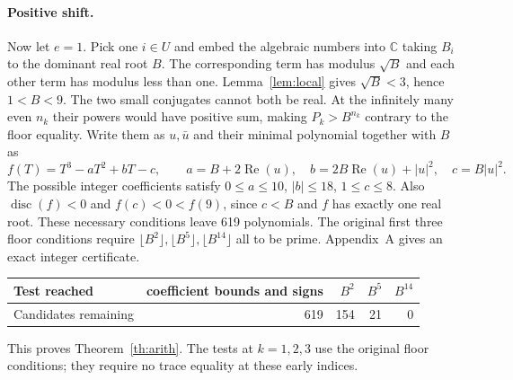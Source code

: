 \documentclass[11pt]{article}
\newcommand{\floor}[1]{\lfloor #1\rfloor}
\newcommand{\Rea}{\operatorname{Re}}
\begin{document}
\paragraph{Positive shift.}
Now let $e=1$. Pick one $i\in U$ and embed the algebraic numbers into $\mathbb C$ taking $B_i$ to the dominant real root $B$. The corresponding term has modulus $\sqrt B$ and each other term has modulus less than one. Lemma~\ref{lem:local} gives $\sqrt B<3$, hence $1<B<9$. The two small conjugates cannot both be real. At the infinitely many even $n_k$ their powers would have positive sum, making $P_k>B^{n_k}$ contrary to the floor equality. Write them as $u,\bar u$ and their minimal polynomial together with $B$ as
\[
 f(T)=T^3-aT^2+bT-c,\qquad a=B+2\Rea(u),\quad
 b=2B\Rea(u)+|u|^2,\quad c=B|u|^2.
\]
The possible integer coefficients satisfy $0\le a\le10$, $|b|\le18$, $1\le c\le8$. Also $\operatorname{disc}(f)<0$ and $f(c)<0<f(9)$, since $c<B$ and $f$ has exactly one real root. These necessary conditions leave 619 polynomials. The original first three floor conditions require $\floor{B^2},\floor{B^5},\floor{B^{14}}$ all to be prime. Appendix~A gives an exact integer certificate.
\begin{center}
\begin{tabular}{lrrrr}
\toprule
Test reached & coefficient bounds and signs & $B^2$ & $B^5$ & $B^{14}$\\
\midrule
Candidates remaining & 619 & 154 & 21 & 0\\
\bottomrule
\end{tabular}
\end{center}
This proves Theorem~\ref{th:arith}. The tests at $k=1,2,3$ use the original floor conditions; they require no trace equality at these early indices.
\end{document}
